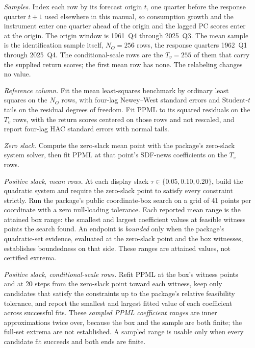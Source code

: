 \documentclass[11pt]{article}
\begin{document}
\emph{Samples.} Index each row by its forecast origin \(t\), one quarter before the response
quarter \(t+1\) used elsewhere in this manual, so consumption growth and the instrument enter one
quarter ahead of the origin and the lagged PC scores enter at the origin. The origin window is
1961~Q4 through 2025~Q3. The mean sample is the identification sample itself, \(N_O=256\) rows,
the response quarters 1962~Q1 through 2025~Q4. The conditional-scale rows are the \(T_v=255\) of
them that carry the supplied return scores; the first mean row has none. The relabeling changes no
value.

\emph{Reference column.} Fit the mean least-squares benchmark by ordinary least squares on the \(N_O\) rows, with four-lag
Newey--West standard errors and Student-\(t\) tails on the residual degrees of freedom. Fit PPML to
its squared residuals on the \(T_v\) rows, with the return scores centered on those rows and not
rescaled, and report four-lag HAC standard errors with normal tails.

\emph{Zero slack.} Compute the zero-slack mean point with the package's zero-slack system solver,
then fit PPML at that point's SDF-news coefficients on the \(T_v\) rows.

\emph{Positive slack, mean rows.} At each display slack \(\tau\in\{0.05,0.10,0.20\}\), build the
quadratic system and require the zero-slack point to satisfy every constraint strictly. Run the
package's public coordinate-box search on a grid of 41 points per coordinate with a zero
null-loading tolerance. Each reported mean range is the attained box range: the smallest and largest
coefficient values at feasible witness points the search found. An endpoint is \emph{bounded} only
when the package's quadratic-set evidence, evaluated at the zero-slack point and the box witnesses,
establishes boundedness on that side. These ranges are attained values, not certified extrema.

\emph{Positive slack, conditional-scale rows.} Refit PPML at the box's witness points and at 20
steps from the zero-slack point toward each witness, keep only candidates that satisfy the
constraints up to the package's relative feasibility tolerance, and report the smallest and largest
fitted value of each coefficient across successful fits. These \emph{sampled PPML coefficient
ranges} are inner approximations twice over, because the box and the sample are both finite; the
full-set extrema are not established. A sampled range is usable only when every candidate fit
succeeds and both ends are finite.
\end{document}
